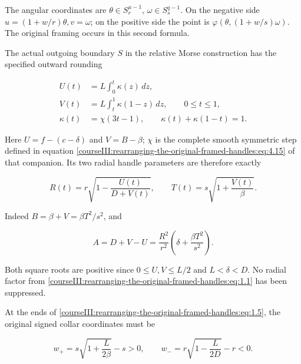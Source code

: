 The angular coordinates are \(\theta\in S_r^{\mu-1}\), \(\omega\in S_s^{q-1}\). On the negative side \(u=(1+w/r)\theta,v=\omega\); on the positive side the point is \(\varphi(\theta,(1+w/s)\omega)\). The original framing occurs in this second formula.

The actual outgoing boundary \(S\) in the relative Morse construction has the specified outward rounding

\begin{equation}
\begin{aligned}
U(t)&=L\int_0^t\kappa(z)\,dz,\\
V(t)&=L\int_t^1\kappa(1-z)\,dz,\qquad 0\leq t\leq1,\\
\kappa(t)&=\chi(3t-1),\qquad \kappa(t)+\kappa(1-t)=1.
\end{aligned}
\label{courseIII:rearranging-the-original-framed-handles:eq:1.5}
\end{equation}

Here \(U=f-(c-\delta)\) and \(V=B-\beta\); \(\chi\) is the complete smooth symmetric step defined in equation \eqref{courseIII:rearranging-the-original-framed-handles:eq:4.15} of that companion. Its two radial handle parameters are therefore exactly

\begin{equation}
R(t)=r\sqrt{1-\frac{U(t)}{D+V(t)}},
\qquad
T(t)=s\sqrt{1+\frac{V(t)}{\beta}}.
\label{courseIII:rearranging-the-original-framed-handles:eq:1.6}
\end{equation}

Indeed \(B=\beta+V=\beta T^2/s^2\), and

\begin{equation}
A=D+V-U=\frac{R^2}{r^2}
       \left(\delta+\frac{\beta T^2}{s^2}\right).
\label{courseIII:rearranging-the-original-framed-handles:eq:1.7}
\end{equation}

Both square roots are positive since \(0\leq U,V\leq L/2\) and \(L<\delta<D\). No radial factor from \eqref{courseIII:rearranging-the-original-framed-handles:eq:1.1} has been suppressed.

At the ends of \eqref{courseIII:rearranging-the-original-framed-handles:eq:1.5}, the original signed collar coordinates must be

\begin{equation}
w_+=s\sqrt{1+\frac{L}{2\beta}}-s>0,\qquad
w_-=r\sqrt{1-\frac{L}{2D}}-r<0.
\label{courseIII:rearranging-the-original-framed-handles:eq:1.8}
\end{equation}

